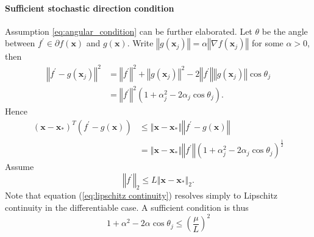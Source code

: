\documentclass{article}
\renewcommand{\vec}[1]{\boldsymbol{#1}}
\newcommand{\norm}[1]{\left\Vert #1 \right\Vert}
\begin{document}
\paragraph{Sufficient stochastic direction condition} Assumption \ref{eq:angular_condition} can be further elaborated.
Let $\theta$ be the angle between $f^\prime \in\partial f(\vec{x})$ and $g(\vec{x})$. Write $\norm{g(\vec{x}_j)} = \alpha \norm{\nabla f(\vec{x}_j)}$ for some $\alpha>0$,
then
\begin{align}
	\norm{f^\prime-g(\vec{x}_j)}^2 &= \norm{f^\prime}^2 + \norm{g(\vec{x}_j)}^2 -2\norm{f^\prime}\norm{g(\vec{x}_j)}\cos\theta_j\\
	&=  \norm{f^\prime}^2(1+\alpha_j^2-2\alpha_j \cos\theta_j).
\end{align}
Hence
\begin{align}
	(\vec{x}-\vec{x}_*)^T (f^\prime -g(\vec{x})) &\leq \norm{\vec{x}-\vec{x}_*} \norm{f^\prime -g(\vec{x})}\\
	&= \norm{\vec{x}-\vec{x}_*} \norm{f^\prime}(1+\alpha_j^2-2\alpha_j \cos\theta_j)^{\frac{1}{2}}
\end{align}
Assume
\begin{equation}
\norm{f^\prime}_2\leq L \norm{\vec{x}-\vec{x}_*}_2.
\label{eq:lipschitz continuity}
\end{equation}
Note that equation (\ref{eq:lipschitz continuity}) resolves simply to Lipschitz continuity in the differentiable case.
A sufficient condition is thus
\begin{equation}
	1+\alpha^2-2\alpha \cos\theta_j\leq (\frac{\mu}{L})^2
\end{equation}
\end{document}
